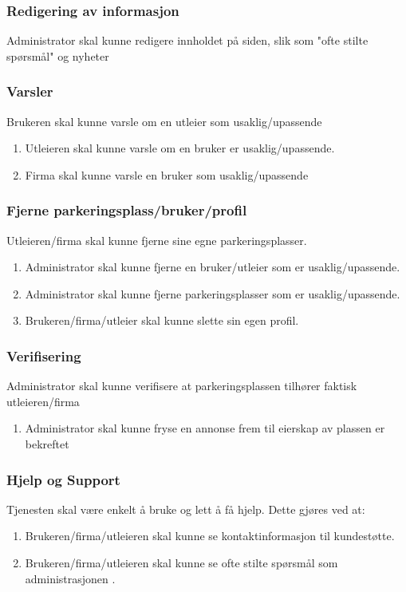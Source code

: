 \subsubsection{Redigering av informasjon}
\label{redigering}
Administrator skal kunne redigere innholdet på siden, slik som "ofte stilte spørsmål" og nyheter

\subsubsection{Varsler}
\label{merking}
Brukeren skal kunne varsle om en utleier som usaklig/upassende
\begin{enumerate}[label=(\alph*)]
    \item Utleieren skal kunne varsle om en bruker er usaklig/upassende.
    \item Firma skal kunne varsle en bruker som usaklig/upassende
\end{enumerate}

\subsubsection{Fjerne parkeringsplass/bruker/profil}
\label{fjerne}
Utleieren/firma skal kunne fjerne sine egne parkeringsplasser.
\begin{enumerate}[label=(\alph*)]
    \item Administrator skal kunne fjerne en bruker/utleier som er usaklig/upassende.
    \item Administrator skal kunne fjerne parkeringsplasser som er usaklig/upassende.
    \item Brukeren/firma/utleier skal kunne slette sin egen profil.
    
\end{enumerate}

\subsubsection{Verifisering}
\label{verifisering}
Administrator skal kunne verifisere at parkeringsplassen tilhører faktisk utleieren/firma
\begin{enumerate}[label=(\alph*)]
    \item Administrator skal kunne fryse en annonse frem til eierskap av plassen er bekreftet
\end{enumerate}

\subsubsection{Hjelp og Support}
\label{hjelp_support}
Tjenesten skal være enkelt å bruke og lett å få hjelp. Dette gjøres ved at:
\begin{enumerate}[label=(\alph*)]
    \item Brukeren/firma/utleieren skal kunne se kontaktinformasjon til kundestøtte.
    \item Brukeren/firma/utleieren skal kunne se ofte stilte spørsmål som administrasjonen . 

\end{enumerate}

